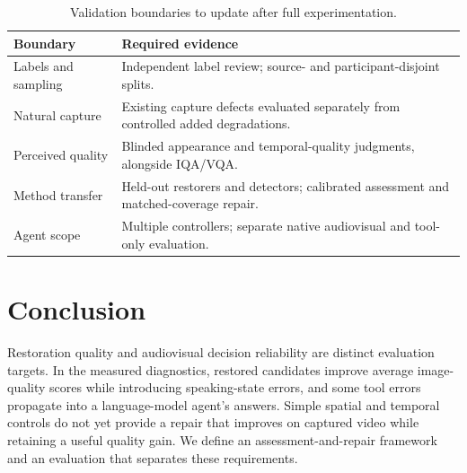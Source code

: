 \begin{table}[t]
\centering\small
\caption{Validation boundaries to update after full experimentation.}
\label{tab:validation}
\begin{tabularx}{\columnwidth}{@{}p{}X@{}}
\toprule
Boundary & Required evidence\\
\midrule
Labels and sampling & Independent label review; source- and participant-disjoint splits.\\
Natural capture & Existing capture defects evaluated separately from controlled added degradations.\\
Perceived quality & Blinded appearance and temporal-quality judgments, alongside IQA/VQA.\\
Method transfer & Held-out restorers and detectors; calibrated assessment and matched-coverage repair.\\
Agent scope & Multiple controllers; separate native audiovisual and tool-only evaluation.\\
\bottomrule
\end{tabularx}
\end{table}

\section{Conclusion}
Restoration quality and audiovisual decision reliability are distinct evaluation targets. In the measured diagnostics, restored candidates improve average image-quality scores while introducing speaking-state errors, and some tool errors propagate into a language-model agent's answers. Simple spatial and temporal controls do not yet provide a repair that improves on captured video while retaining a useful quality gain. We define an assessment-and-repair framework and an evaluation that separates these requirements. 

